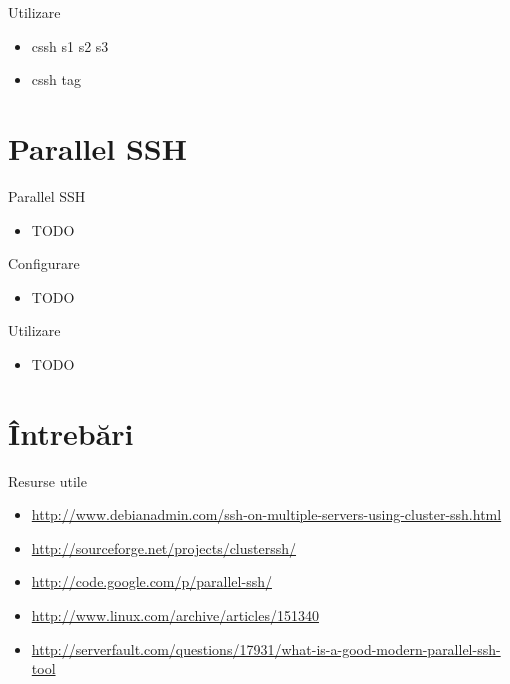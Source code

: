\documentclass{beamer}
\begin{document}
\begin{frame}{Utilizare}
	\begin{itemize}
		\item cssh s1 s2 s3
		\item cssh tag
	\end{itemize}
\end{frame}

\section{Parallel SSH}

\frame{\tableofcontents[currentsection]}

\begin{frame}{Parallel SSH}
	\begin{itemize}
		\item TODO
	\end{itemize}
\end{frame}

\begin{frame}{Configurare}
	\begin{itemize}
		\item TODO
	\end{itemize}
\end{frame}

\begin{frame}{Utilizare}
	\begin{itemize}
		\item TODO
	\end{itemize}
\end{frame}

\section{Întrebări}

\frame{\tableofcontents[currentsection]}

\begin{frame}{Resurse utile}
	\begin{itemize}
		\item
		\url{http://www.debianadmin.com/ssh-on-multiple-servers-using-cluster-ssh.html}
		\item \url{http://sourceforge.net/projects/clusterssh/}
		\item \url{http://code.google.com/p/parallel-ssh/}
		\item \url{http://www.linux.com/archive/articles/151340}
		\item
		\url{http://serverfault.com/questions/17931/what-is-a-good-modern-parallel-ssh-tool}
	\end{itemize}
\end{frame}
\end{document}
